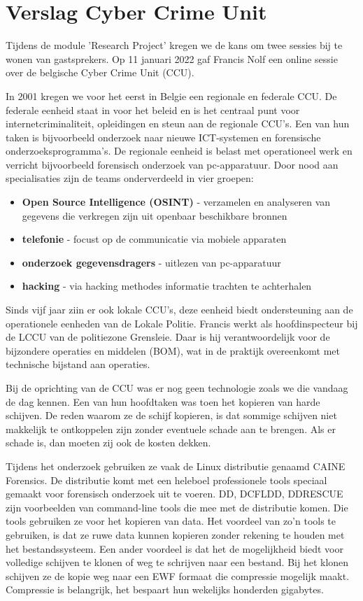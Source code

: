 \chapter{Verslag Cyber Crime Unit}

Tijdens de module 'Research Project' kregen we de kans om twee sessies bij te wonen van
gastsprekers. Op 11 januari 2022 gaf Francis Nolf een online sessie over de belgische Cyber Crime
Unit (CCU). 

In 2001 kregen we voor het eerst in Belgie een regionale en federale CCU. De federale eenheid staat
in voor het beleid en is het centraal punt voor internetcriminaliteit, opleidingen en steun aan de
regionale CCU's. Een van hun taken is bijvoorbeeld onderzoek naar nieuwe ICT-systemen en forensische
onderzoeksprogramma's. De regionale eenheid is belast met operationeel werk en verricht bijvoorbeeld
forensisch onderzoek van pc-apparatuur. Door nood aan specialisaties zijn de teams onderverdeeld in
vier groepen:
\begin{itemize}
  \item \textbf{Open Source Intelligence (OSINT)} - verzamelen en analyseren van gegevens die verkregen
    zijn uit openbaar beschikbare bronnen
  \item \textbf{telefonie} - focust op de communicatie via mobiele apparaten
  \item \textbf{onderzoek gegevensdragers} - uitlezen van pc-apparatuur
  \item \textbf{hacking} - via hacking methodes informatie trachten te achterhalen
\end{itemize}

Sinds vijf jaar ziin er ook lokale CCU's, deze eenheid biedt ondersteuning aan de operationele
eenheden van de Lokale Politie. Francis werkt als hoofdinspecteur bij de LCCU van de politiezone
Grensleie. Daar is hij verantwoordelijk voor de bijzondere operaties en middelen (BOM), wat in de
praktijk overeenkomt met technische bijstand aan operaties.

Bij de oprichting van de CCU was er nog geen technologie zoals we die vandaag de dag kennen. Een van
hun hoofdtaken was toen het kopieren van harde schijven. De reden waarom ze de schijf kopieren, is
dat sommige schijven niet makkelijk te ontkoppelen zijn zonder eventuele schade aan te brengen. Als
er schade is, dan moeten zij ook de kosten dekken.

Tijdens het onderzoek gebruiken ze vaak de Linux distributie genaamd CAINE Forensics. De distributie
komt met een heleboel professionele tools speciaal gemaakt voor forensisch onderzoek uit te voeren.
DD, DCFLDD, DDRESCUE zijn voorbeelden van command-line tools die mee met de distributie komen. Die
tools gebruiken ze voor het kopieren van data. Het voordeel van zo'n tools te gebruiken, is dat ze
ruwe data kunnen kopieren zonder rekening te houden met het bestandssysteem. Een ander voordeel is
dat het de mogelijkheid biedt voor volledige schijven te klonen of weg te schrijven naar een
bestand. Bij het klonen schijven ze de kopie weg naar een EWF formaat die compressie mogelijk maakt.
Compressie is belangrijk, het bespaart hun wekelijks honderden gigabytes.


